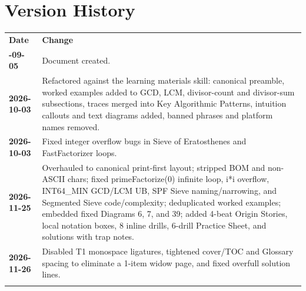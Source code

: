 \documentclass[11pt,a4paper]{article}
\theoremstyle{definition}
\begin{document}
\section*{Version History}

\begin{center}
\begingroup
\small
{}
\begin{tabularx}{\textwidth}{>{\bfseries}l >{\raggedright\arraybackslash}X}
\arrayrulecolor{primaryblue}\toprule[1.2pt]
\rowcolor{primaryblue!10}
\textcolor{primaryblue}{\textbf{Date}} & \textcolor{primaryblue}{\textbf{Change}} \\
\arrayrulecolor{codeframe}\midrule[0.6pt]
2026-09-05 & Document created. \\
2026-10-03 & Refactored against the learning materials skill: canonical preamble, worked examples added to GCD, LCM, divisor-count and divisor-sum subsections, traces merged into Key Algorithmic Patterns, intuition callouts and text diagrams added, banned phrases and platform names removed. \\
2026-10-03 & Fixed integer overflow bugs in Sieve of Eratosthenes and FastFactorizer loops. \\
2026-11-25 & Overhauled to canonical print-first layout; stripped BOM and non-ASCII chars; fixed primeFactorize(0) infinite loop, i*i overflow, INT64\_MIN GCD/LCM UB, SPF Sieve naming/narrowing, and Segmented Sieve code/complexity; deduplicated worked examples; embedded fixed Diagrams 6, 7, and 39; added 4-beat Origin Stories, local notation boxes, 8 inline drills, 6-drill Practice Sheet, and solutions with trap notes. \\
2026-11-26 & Disabled T1 monospace ligatures, tightened cover/TOC and Glossary spacing to eliminate a 1-item widow page, and fixed overfull solution lines. \\
\arrayrulecolor{primaryblue}\bottomrule[1.2pt]
\end{tabularx}
\endgroup
\end{center}
\end{document}
